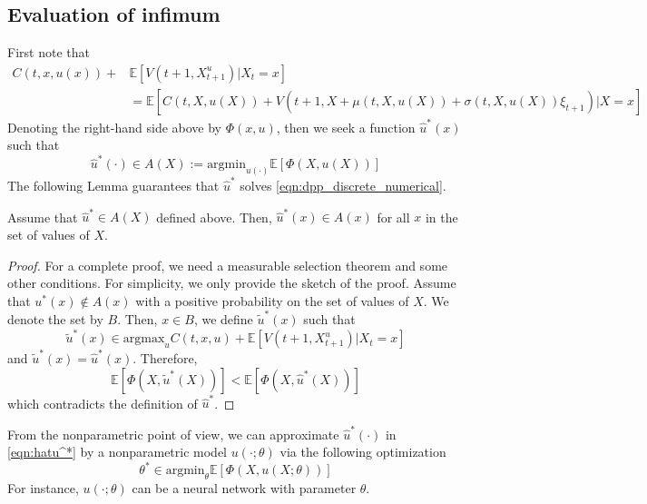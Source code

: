 \documentclass[11pt]{book}
\begin{document}
\subsection{Evaluation of infimum}
First note that 
\begin{equation}
\begin{split}
    C(t,x,u(x))+&\mathbb{E}[V(t+1,X^u_{t+1})|X_t=x]
    \\
    &=\mathbb{E}[C(t,X,u(X))+ V(t+1,X+\mu(t,X,u(X))+\sigma(t,X,u(X))\xi_{t+1})|X=x]
\end{split}
\end{equation}
Denoting the right-hand side above by $\Phi(x,u)$, then we seek a function $\hat{u}^*(x)$ such that 
\begin{equation}\label{eqn:hatu^*}
    \hat{u}^*(\cdot)\in A(X):=\textrm{argmin}_{u(\cdot)}\mathbb{E}[\Phi(X,u(X))]
\end{equation}
The following Lemma guarantees that $\hat{u}^*$ solves \eqref{eqn:dpp_discrete_numerical}.
\begin{lem}\label{lem:expectation_minimization}
    Assume that $\hat{u}^*\in A(X)$ defined above. Then, $\hat{u}^*(x)\in A(x)$ for all $x$ in the set of values of $X$.
\end{lem}
\begin{proof}
     For a complete proof, we need a measurable selection theorem and some other conditions. For simplicity, we only provide the sketch of the proof. Assume that $u^*(x)\not\in A(x)$ with a positive probability on the set of values of $X$. We denote the set by $B$. Then, $x\in B$, we define $\tilde{u}^*(x)$ such that
     \[
     \tilde{u}^*(x)\in\textrm{argmax}_{u}
    C(t,x,u) + \mathbb{E}[V(t+1,X^u_{t+1})|X_t=x]
     \]
     and $\tilde{u}^*(x)=\hat{u}^*(x)$. 
     Therefore, 
     \[
     \mathbb{E}[\Phi(X,\tilde{u}^*(X))]<\mathbb{E}[\Phi(X,\hat{u}^*(X))]
     \]
     which contradicts the definition of $\hat{u}^*$.
\end{proof}

From the nonparametric point of view, we can approximate $\hat{u}^*(\cdot)$ in \eqref{eqn:hatu^*} by a nonparametric model $u(\cdot;\theta)$ via the following optimization
\begin{equation}
    \theta^*\in \textrm{argmin}_{\theta}\mathbb{E}[\Phi(X,u(X;\theta))]
\end{equation}
For instance, $u(\cdot;\theta)$ can be a neural network with parameter $\theta$.
\end{document}
